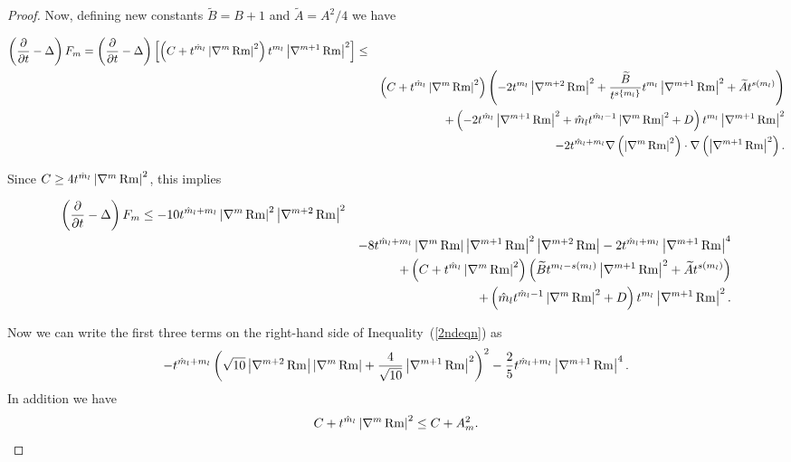 \begin{proof}
Now, defining new constants $\widetilde B=B+1$ and $\widetilde
A=A^2/4$ we have

\begin{eqnarray*}
\left(  \frac{\partial}{\partial t}-\Delta\right)F_m=
\left( \frac{\partial}{\partial t}-\Delta\right)  \left[ \left(
C+t^{\hat{m}_l  }\left\vert \nabla^{m}\operatorname{Rm} \right\vert
^{2}\right)  t^{m_l }\left\vert
\nabla^{m+1}\operatorname{Rm}\right\vert ^{2}\right]  \leq   \\
& & \left(  C+t^{\hat{m}_l  }\left\vert \nabla^{m}
\operatorname{Rm}\right\vert ^{2}\right)  \left( -2t^{m_l
}\left\vert \nabla^{m+2} \operatorname{Rm} \right\vert ^{2}
+\frac{\widetilde B}{t^{s\{m_l\}}} t^{m_l}\left\vert \nabla^{m+1}
\operatorname{Rm} \right\vert ^{2}+\widetilde At^{s(m_l)} \right) \\
& &  +\left( -2t^{\hat{m}_l }\left\vert
\nabla^{m+1}\operatorname{Rm} \right\vert ^{2} +\hat{m}_l
t^{\hat{m}_l  -1}\left\vert \nabla^{m}\operatorname{Rm}\right\vert
^{2}+D \right) t^{m_
l} \left\vert \nabla^{m+1} \operatorname{Rm}\right\vert ^{2}\\
& &  -2t^{\hat{m}_l  +m_l } \nabla\left(\left\vert
\nabla^{m}\operatorname{Rm}\right\vert ^{2}\right)\cdot
\nabla\left(\left\vert \nabla^{m+1}\operatorname{Rm}\right\vert
^{2}\right). \end{eqnarray*}

Since $C\ge 4t^{\hat
m_l}\left\vert\nabla^m\operatorname{Rm}\right\vert^2$, this implies

\begin{eqnarray}
\lefteqn{ \left(  \frac{\partial}{\partial t}-\Delta\right) F_m \leq
-10t^{\hat{m}_l  +m_l} \left\vert
\nabla^{m}\Rm\right\vert ^{2}\left\vert
\nabla^{m+2}\Rm\right\vert ^{2}}\label{2ndeqn}\\
 & & -8t^{\hat{m}_l  +m_l  }\left\vert
\nabla^{m}\Rm\right\vert \left\vert \nabla^{m+1}%
\Rm\right\vert ^{2}\left\vert \nabla^{m+2}\Rm%
\right\vert  -2t^{\hat m_l  +m_l  }\left\vert
\nabla^{m+1}\Rm\right\vert ^{4}\nonumber\\
 & & +\left(  C+t^{\hat m_l}\left\vert \nabla^{m}
\Rm\right\vert ^{2}\right)  \left( \widetilde
Bt^{m_l-s(m_l) }\left\vert \nabla^{m+1}\Rm\right\vert
^{2}+\widetilde At^{s(m_l)}\right) \nonumber\\
 & & +\left(\hat m_l  t^{\hat{m}_l -1}\left\vert
\nabla^{m}\Rm\right\vert ^{2}+D\right) t^{m_l
}\left\vert \nabla^{m+1}\Rm \right\vert
^{2}.\nonumber
\end{eqnarray}

Now we can write the first three terms on the right-hand side of
Inequality~(\ref{2ndeqn}) as \begin{equation}\label{3rdeqn} -t^{\hat
m_l+m_l}\left(\sqrt{10}\left\vert\nabla^{m+2}\operatorname{Rm}\right\vert
\left\vert\nabla^m\operatorname{Rm}\right\vert+\frac{4}{\sqrt{10}}\left\vert\nabla^{m+1}
\operatorname{Rm}\right\vert^2\right)^2-\frac{2}{5}t^{\hat
m_l+m_l}\left\vert\nabla^{m+1}\operatorname{Rm}\right\vert^4.\end{equation}
In addition we have
\begin{equation}\label{4theqn}
C+t^{\hat m_l}\left\vert \nabla^{m} \operatorname{Rm}\right\vert
^{2}  \leq  C+A_m^2.
\end{equation}


\end{proof}
